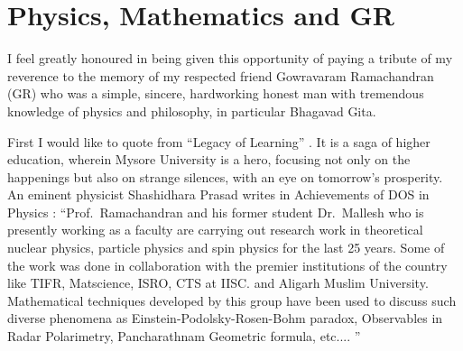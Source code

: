 \chapter{Physics, Mathematics and GR}\label{chap17}



I feel greatly honoured in being given this opportunity of paying a tribute of my reverence to the memory of my respected friend Gowrava\-ram Ramachandran (GR) who was a simple, sincere, hardworking honest man with tremendous knowledge of physics and philosophy, in particular Bhagavad Gita.

First I would like to quote from “Legacy of Learning” \cite{chap17-key01BSK}. It is a saga of higher education, wherein Mysore University is a hero, focusing not only on the happenings but also on strange silences, with an eye on tomorrow's prosperity. An eminent physicist Shashidhara Prasad writes in Achievements of DOS in Physics \cite{chap17-key02BSK}: “Prof.\ Ramachandran and his former student Dr.\ Mallesh who is presently working as a faculty are carrying out research work in theoretical nuclear physics, particle physics and spin physics for the last 25 years. Some of the work was done in collaboration with the premier institutions of the country like TIFR, Matscience, ISRO, CTS at IISC. and Aligarh Muslim University. Mathematical techniques developed by this group have been used to discuss such diverse phenomena as Einstein-Podolsky-Rosen-Bohm paradox, Observables in Radar Polarimetry, Pancharathnam Geometric formula, etc.... ”

